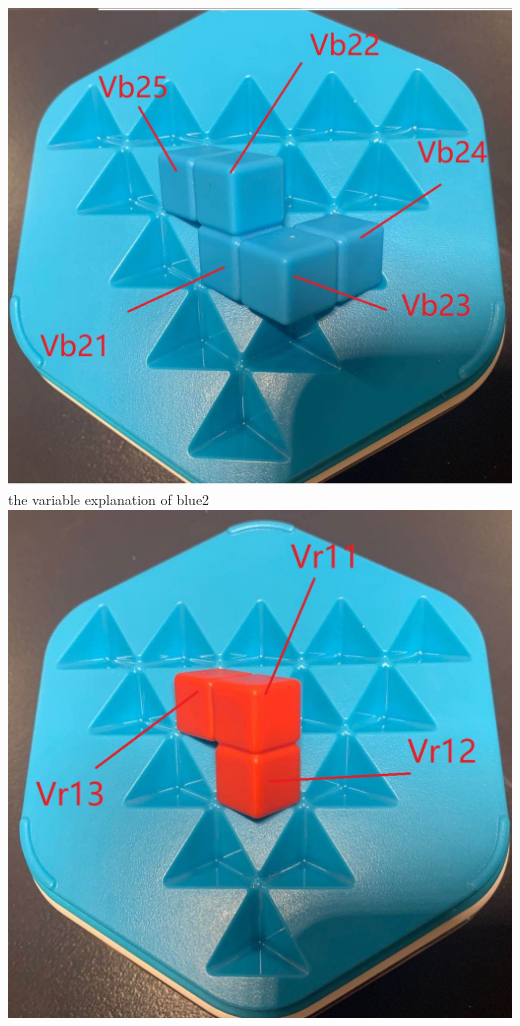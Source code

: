 \begin{center}
\includegraphics[scale=0.2]{figs/3Dblue2.jpg}\\
the variable explanation of blue2\\
\includegraphics[scale=0.2]{figs/3Dred1.jpg}\\

\end{center}
